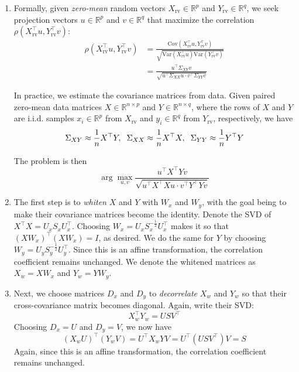 \documentclass[10pt]{article}
\begin{document}
\begin{multicols}{2}
\begin{addmargin}[0.8em]{0.5em}
\begin{enumerate}[label=(\alph*)]
        \item Formally, given \textit{zero-mean} random vectors $X_{\text{rv}} \in \mathbb{R}^p$ and $Y_{\text{rv}} \in \mathbb{R}^q$, we seek projection vectors $u \in \mathbb{R}^p$ and $v \in \mathbb{R}^q$ that maximize the correlation $\rho(X_{\text{rv}}^\top u, Y_{\text{rv}}^\top v)$:
        \begin{align*}
            \rho(X_{\text{rv}}^\top u, Y_{\text{rv}}^\top v) 
            &= \frac{\text{Cov}(X_{\text{rv}}^\top u, Y_{\text{rv}}^\top v)}{\sqrt{\text{Var}(X_{\text{rv}}^\top u)\text{Var}(Y_{\text{rv}}^\top v)}} \\
            &= \frac{u^\top \Sigma_{XY} v}{\sqrt{u^\top\Sigma_{XX} u \cdot v^\top \Sigma_{YY} v}}
        \end{align*}
        
        In practice, we estimate the covariance matrices from data. Given paired zero-mean data matrices $X \in \mathbb{R}^{n \times p}$ and $Y \in \mathbb{R}^{n \times q}$, where the rows of $X$ and $Y$ are i.i.d. samples $x_i \in \mathbb{R}^p$ from $X_{\text{rv}}$ and $y_i \in \mathbb{R}^q$ from $Y_{\text{rv}}$, respectively, we have
        \begin{align*}
            \Sigma_{XY} \approx \frac{1}{n} X^\top Y, \hspace{0.2cm}
            \Sigma_{XX} \approx \frac{1}{n} X^\top X, \hspace{0.2cm}
            \Sigma_{YY} \approx \frac{1}{n} Y^\top Y 
        \end{align*}
        
        The problem is then
        $$
        \arg\max_{u,v} \frac{u^\top X^\top Yv}{\sqrt{u^\top X^\top Xu\cdot v^\top Y^\top Yv}}
        $$
        
        \item The first step is to \textit{whiten} $X$ and $Y$ with $W_x$ and $W_y$, with the goal being to make their covariance matrices become the identity. Denote the SVD of $X^\top X = U_x S_x U_x^\top$.
        Choosing $W_x = U_x S_x^{-\frac{1}{2}} U_x^\top$ makes it so that $(X W_x)^\top (X W_x) = I$, as desired. We do the same for $Y$ by choosing $W_y = U_y S_y^{-\frac{1}{2}} U_y^\top$. Since this is an affine transformation, the correlation coefficient remains unchanged. We denote the whitened matrices as $X_w = XW_x$ and $Y_w = YW_y$.
        
        \item Next, we choose matrices $D_x$ and $D_y$ to \textit{decorrelate} $X_w$ and $Y_w$ so that their cross-covariance matrix becomes diagonal. Again, write their SVD:
        $$
        X_w^\top Y_w = U S V^\top
        $$
        Choosing $D_x = U$ and $D_y = V$, we now have
        $$
        (X_w U)^\top  (Y_w V) = U^\top X_w YV = U^\top (U S V^\top) V = S
        $$
        Again, since this is an affine transformation, the correlation coefficient remains unchanged. 
        

\end{enumerate}
\end{addmargin}
\end{multicols}
\end{document}
